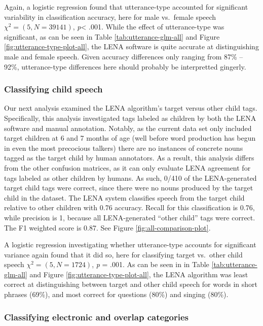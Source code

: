 \documentclass[man,floatsintext]{apa6}
\theoremstyle{definition}
\theoremstyle{definition}
\theoremstyle{definition}
\theoremstyle{remark}
\begin{document}
Again, a logistic regression found that utterance-type accounted for
significant variability in classification accuracy, here for male
vs.~female speech \(\chi^2 = (5, N=39141)\), \emph{p}\textless{} .001.
While the effect of utterance-type was significant, as can be seen in
Table \ref{tab:utterance-glm-all} and Figure
\ref{fig:utterance-type-plot-all}, the LENA software is quite accurate
at distinguishing male and female speech. Given accuracy differences
only ranging from 87\% -- 92\%, utterance-type differences here should
probably be interpretted gingerly.

\hypertarget{classifying-child-speech}{%
\subsubsection{Classifying child
speech}\label{classifying-child-speech}}

Our next analysis examined the LENA algorithm's target versus other
child tags. Specifically, this analysis investigated tags labeled as
children by both the LENA software and manual annotation. Notably, as
the current data set only included target children at 6 and 7 months of
age (well before word production has begun in even the most precocious
talkers) there are no instances of concrete nouns tagged as the target
child by human annotators. As a result, this analysis differs from the
other confusion matrices, as it can only evaluate LENA agreement for
tags labeled as other children by humans. As such, 0/410 of the
LENA-generated target child tags were correct, since there were no nouns
produced by the target child in the dataset. The LENA system classifies
speech from the target child relative to other children with 0.76
accuracy. Recall for this classification is 0.76, while precision is 1,
because all LENA-generated \enquote{other child} tags were correct. The
F1 weighted score is 0.87. See Figure \ref{fig:all-comparison-plot}.

A logistic regression investigating whether utterance-type accounts for
significant variance again found that it did so, here for classifying
target vs.~other child speech \(\chi^2 = (5, N=1724)\), \emph{p} = .001.
As can be seen in in Table \ref{tab:utterance-glm-all} and Figure
\ref{fig:utterance-type-plot-all}, the LENA algorithm was least correct
at distinguishing between target and other child speech for words in
short phrases (69\%), and most correct for questions (80\%) and singing
(80\%).

\hypertarget{classifying-electronic-and-overlap-categories}{%
\subsubsection{Classifying electronic and overlap
categories}\label{classifying-electronic-and-overlap-categories}}
\end{document}

